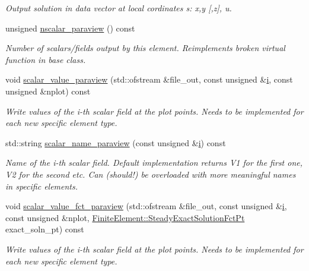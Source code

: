 \begin{DoxyCompactItemize}
\begin{DoxyCompactList}\small\item\em Output solution in data vector at local cordinates s\+: x,y \mbox{[},z\mbox{]}, u. \end{DoxyCompactList}\item 
unsigned \hyperlink{classoomph_1_1PoissonEquations_a8a34f70a57c1aad552a9624ea0fb0906}{nscalar\+\_\+paraview} () const
\begin{DoxyCompactList}\small\item\em Number of scalars/fields output by this element. Reimplements broken virtual function in base class. \end{DoxyCompactList}\item 
void \hyperlink{classoomph_1_1PoissonEquations_a302df9f1a73fb1404f686a75b2fe58be}{scalar\+\_\+value\+\_\+paraview} (std\+::ofstream \&file\+\_\+out, const unsigned \&\hyperlink{cfortran_8h_adb50e893b86b3e55e751a42eab3cba82}{i}, const unsigned \&nplot) const
\begin{DoxyCompactList}\small\item\em Write values of the i-\/th scalar field at the plot points. Needs to be implemented for each new specific element type. \end{DoxyCompactList}\item 
std\+::string \hyperlink{classoomph_1_1PoissonEquations_ac52b68b17f7545128bfdeecf60838188}{scalar\+\_\+name\+\_\+paraview} (const unsigned \&\hyperlink{cfortran_8h_adb50e893b86b3e55e751a42eab3cba82}{i}) const
\begin{DoxyCompactList}\small\item\em Name of the i-\/th scalar field. Default implementation returns V1 for the first one, V2 for the second etc. Can (should!) be overloaded with more meaningful names in specific elements. \end{DoxyCompactList}\item 
void \hyperlink{classoomph_1_1PoissonEquations_afcf08b45211a5a3bcf0c80919e50c9fe}{scalar\+\_\+value\+\_\+fct\+\_\+paraview} (std\+::ofstream \&file\+\_\+out, const unsigned \&\hyperlink{cfortran_8h_adb50e893b86b3e55e751a42eab3cba82}{i}, const unsigned \&nplot, \hyperlink{classoomph_1_1FiniteElement_a690fd33af26cc3e84f39bba6d5a85202}{Finite\+Element\+::\+Steady\+Exact\+Solution\+Fct\+Pt} exact\+\_\+soln\+\_\+pt) const
\begin{DoxyCompactList}\small\item\em Write values of the i-\/th scalar field at the plot points. Needs to be implemented for each new specific element type. \end{DoxyCompactList}\item 

\end{DoxyCompactItemize}
